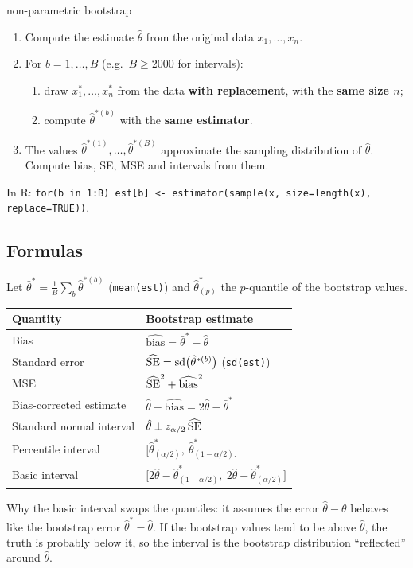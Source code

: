\begin{algo}{non-parametric bootstrap}
\begin{enumerate}
  \item Compute the estimate $\hat\theta$ from the original data $x_1,\dots,x_n$.
  \item For $b = 1,\dots,B$ (e.g.\ $B\ge2000$ for intervals):
  \begin{enumerate}
    \item draw $x^{*}_1,\dots,x^{*}_n$ from the data \textbf{with replacement}, with the \textbf{same size $n$};
    \item compute $\hat\theta^{*(b)}$ with the \textbf{same estimator}.
  \end{enumerate}
  \item The values $\hat\theta^{*(1)},\dots,\hat\theta^{*(B)}$ approximate the sampling distribution of $\hat\theta$. Compute bias, SE, MSE and intervals from them.
\end{enumerate}
\end{algo}
In R: \texttt{for(b in 1:B) est[b] <- estimator(sample(x, size=length(x), replace=TRUE))}.

\subsection{Formulas}
Let $\bar\theta^* = \frac1B\sum_b\hat\theta^{*(b)}$ (\texttt{mean(est)}) and $\hat\theta^*_{(p)}$ the $p$-quantile of the bootstrap values.
\begin{center}
\begin{tabular}{ll}
\toprule
Quantity & Bootstrap estimate \\
\midrule
Bias & $\widehat{\mathrm{bias}} = \bar\theta^* - \hat\theta$ \\
Standard error & $\widehat{\mathrm{SE}} = \mathrm{sd}\big(\hat\theta^{*(b)}\big)$ \quad(\texttt{sd(est)}) \\
MSE & $\widehat{\mathrm{SE}}^2 + \widehat{\mathrm{bias}}^2$ \\
Bias-corrected estimate & $\hat\theta - \widehat{\mathrm{bias}} = 2\hat\theta - \bar\theta^*$ \\
\midrule
Standard normal interval & $\hat\theta\pm z_{\alpha/2}\,\widehat{\mathrm{SE}}$ \\
Percentile interval & $\big[\hat\theta^*_{(\alpha/2)},\ \hat\theta^*_{(1-\alpha/2)}\big]$ \\
Basic interval & $\big[2\hat\theta-\hat\theta^*_{(1-\alpha/2)},\ 2\hat\theta-\hat\theta^*_{(\alpha/2)}\big]$ \\
\bottomrule
\end{tabular}
\end{center}
Why the basic interval swaps the quantiles: it assumes the error $\hat\theta-\theta$ behaves like the bootstrap error $\hat\theta^*-\hat\theta$. If the bootstrap values tend to be above $\hat\theta$, the truth is probably below it, so the interval is the bootstrap distribution ``reflected'' around $\hat\theta$.

